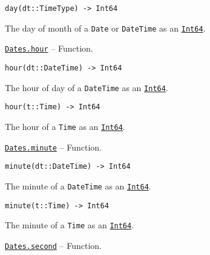 \begin{adjustwidth}{2em}{0pt}


\begin{verbatim}
day(dt::TimeType) -> Int64
\end{verbatim}

The day of month of a \texttt{Date} or \texttt{DateTime} as an \hyperlink{7720564657383125058}{\texttt{Int64}}.



\end{adjustwidth}
\hypertarget{14478105094783051644}{}
\hyperlink{14478105094783051644}{\texttt{Dates.hour}}  -- {Function.}

\begin{adjustwidth}{2em}{0pt}


\begin{verbatim}
hour(dt::DateTime) -> Int64
\end{verbatim}

The hour of day of a \texttt{DateTime} as an \hyperlink{7720564657383125058}{\texttt{Int64}}.




\begin{lstlisting}
hour(t::Time) -> Int64
\end{lstlisting}

The hour of a \texttt{Time} as an \hyperlink{7720564657383125058}{\texttt{Int64}}.



\end{adjustwidth}
\hypertarget{1962337999361765726}{}
\hyperlink{1962337999361765726}{\texttt{Dates.minute}}  -- {Function.}

\begin{adjustwidth}{2em}{0pt}


\begin{verbatim}
minute(dt::DateTime) -> Int64
\end{verbatim}

The minute of a \texttt{DateTime} as an \hyperlink{7720564657383125058}{\texttt{Int64}}.




\begin{lstlisting}
minute(t::Time) -> Int64
\end{lstlisting}

The minute of a \texttt{Time} as an \hyperlink{7720564657383125058}{\texttt{Int64}}.



\end{adjustwidth}
\hypertarget{15148061267327101157}{}
\hyperlink{15148061267327101157}{\texttt{Dates.second}}  -- {Function.}

